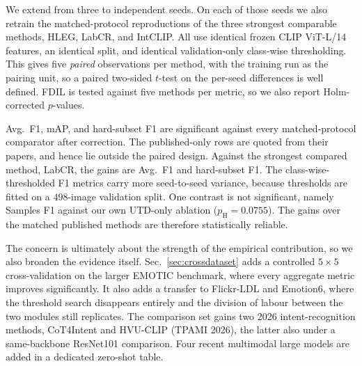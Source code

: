 {

 We extend from three to  independent seeds. On each of those seeds we also retrain the matched-protocol reproductions of the three strongest comparable methods, HLEG, LabCR, and IntCLIP. All use identical frozen CLIP ViT-L/14 features, an identical split, and identical validation-only class-wise thresholding. This gives five \emph{paired} observations per method, with the training run as the pairing unit, so a paired two-sided $t$-test on the per-seed differences is well defined. FDIL is tested against five methods per metric, so we also report Holm-corrected $p$-values.

 Avg.\ F1, mAP, and hard-subset F1 are significant against every matched-protocol comparator after correction. The published-only rows are quoted from their papers, and hence lie outside the paired design. Against the strongest compared method, LabCR, the gains are  Avg.\ F1 and  hard-subset F1. The class-wise-thresholded F1 metrics carry more seed-to-seed variance, because thresholds are fitted on a $498$-image validation split. One contrast is not significant, namely Samples F1 against our own UTD-only ablation ($p_{\mathrm H}=0.0755$). The gains over the matched published methods are therefore statistically reliable.

 The concern is ultimately about the strength of the empirical contribution, so we also broaden the evidence itself. Sec.~\ref{sec:crossdataset} adds a controlled $5\times5$ cross-validation on the larger EMOTIC benchmark, where every aggregate metric improves significantly. It also adds a transfer to Flickr-LDL and Emotion6, where the threshold search disappears entirely and the division of labour between the two modules still replicates. The comparison set gains two 2026 intent-recognition methods, CoT4Intent and HVU-CLIP (TPAMI 2026), the latter also under a same-backbone ResNet101 comparison. Four recent multimodal large models are added in a dedicated zero-shot table.
}
